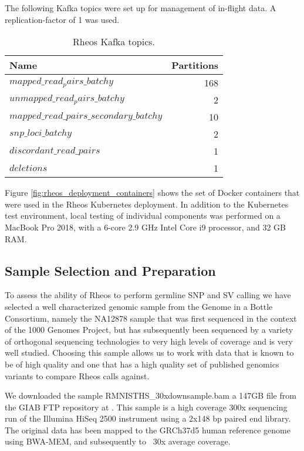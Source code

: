 The following Kafka topics were set up for management of in-flight data. A replication-factor of 1 was used.

\begin{table}[!ht]
    \centering
    \caption{Rheos Kafka topics.}
    \label{tab:rheos_kafka_topics}
    {\begin{tabular}{l | r }
    \toprule
    Name & Partitions \\
    \midrule
    $mapped\_read_pairs\_batchy$ & 168\\
    $unmapped\_read_pairs\_batchy$ & 2\\
    $mapped\_read\_pairs\_secondary\_batchy$ & 10\\
    $snp\_loci\_batchy$ & 2\\
    $discordant\_read\_pairs$ & 1\\
    $deletions$ & 1\\
    \bottomrule
    \end{tabular}}
\end{table}

Figure \ref{fig:rheos_deployment_containers} shows the set of Docker containers that were used in the Rheos Kubernetes deployment. In addition to the Kubernetes test environment, local testing of individual components was performed on a MacBook Pro 2018, with a 6-core 2.9 GHz Intel Core i9 processor, and 32 GB RAM. 

\subsection{Sample Selection and Preparation}

To assess the ability of Rheos to perform germline SNP and SV calling we have selected a well characterized genomic sample from the Genome in a Bottle Consortium\autocite{zook2018reproducible}, namely the NA12878 sample that was first sequenced in the context of the 1000 Genomes Project, but has subsequently been sequenced by a variety of orthogonal sequencing technologies to very high levels of coverage and is very well studied. Choosing this sample allows us to work with data that is known to be of high quality and one that has a high quality set of published genomics variants to compare Rheos calls against.

We downloaded the sample RMNISTHS\_30xdownsample.bam a 147GB file from the GIAB FTP repository at \autocite{giab_ftp}. This sample is a high coverage 300x sequencing run of the Illumina HiSeq 2500 instrument using a 2x148 bp paired end library. The original data has been mapped to the GRCh37d5 human reference genome using BWA-MEM, and subsequently 
 to ~30x average coverage. 

